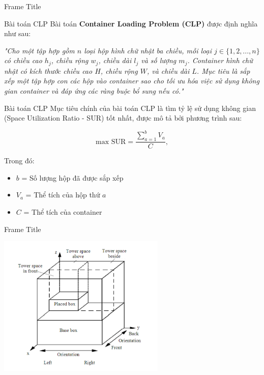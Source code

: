 \documentclass[10pt]{beamer}
\newenvironment{tres important}[2][]{
	\setkeys{EmphEqEnv}{#2}
	\setkeys{EmphEqOpt}{box={\setlength{\fboxsep}{10pt}\fcolorbox{myNewColorA}{white}},#1}
	\EmphEqMainEnv}
{\endEmphEqMainEnv}
\begin{document}
        \begin{frame}{Frame Title}
            
        \end{frame}

        \begin{frame}{Bài toán CLP}
            Bài toán \textbf{Container Loading Problem (CLP)} được định nghĩa như sau:
            \vspace{0.08cm}
            
            \begin{spacing}{1.5}
                \textit{
                    "Cho một tập hợp gồm $n$ loại hộp hình chữ nhật ba chiều, mỗi loại $j \in \{1, 2, ..., n\}$ có chiều cao $h_j$, chiều rộng $w_j$, chiều dài $l_j$ và số lượng $m_j$. Container hình chữ nhật có kích thước chiều cao $H$, chiều rộng $W$, và chiều dài $L$. Mục tiêu là sắp xếp một tập hợp con các hộp vào container sao cho tối ưu hóa việc sử dụng không gian container và đáp ứng các ràng buộc bổ sung nếu có."}
            \end{spacing}
        \end{frame}

        \begin{frame}{Bài toán CLP}
            Mục tiêu chính của bài toán CLP là tìm tỷ lệ sử dụng không gian (Space Utilization Ratio - SUR) tốt nhất, được mô tả bởi phương trình sau:

            \[
            \text{max SUR} = \frac{\sum_{a=1}^{b} V_a}{C}, \tag{1}
            \]
            
            Trong đó:
            \begin{itemize}
                \item $b$ = Số lượng hộp đã được sắp xếp
                \item $V_a$ = Thể tích của hộp thứ $a$
                \item $C$ = Thể tích của container
            \end{itemize}
        
        \end{frame}

        \begin{frame}{Frame Title}
            \begin{center}
                \includegraphics[width=0.6\textwidth]{assets/IntroForCLP_ThirdPic.png}
            \end{center}
        \end{frame}
\end{document}
